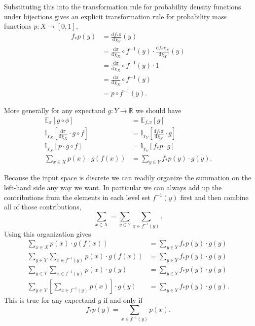 \documentclass[
  letterpaper,
  DIV=11,
  numbers=noendperiod]{scrartcl}
\begin{document}
Substituting this into the transformation rule for probability density
functions under bijections gives an explicit transformation rule for
probability mass functions \(p : X \rightarrow [0, 1]\), \begin{align*}
f_{*} p(y)
&=
\frac{ \mathrm{d} f_{*} \pi }{ \mathrm{d} \chi_{Y} }(y)
\\
&=
\frac{ \mathrm{d} \pi }{ \mathrm{d} \chi_{X} } \circ f^{-1}(y)
\cdot
\frac{ \mathrm{d} f_{*} \chi_{X} }{ \mathrm{d} \chi_{Y} }(y)
\\
&=
\frac{ \mathrm{d} \pi }{ \mathrm{d} \chi_{X} } \circ f^{-1}(y)
\cdot
1
\\
&=
\frac{ \mathrm{d} \pi }{ \mathrm{d} \chi_{X} } \circ f^{-1}(y)
\\
&=
p \circ f^{-1}(y).
\end{align*}

More generally for any expectand \(g : Y \rightarrow \mathbb{R}\) we
should have \begin{align*}
\mathbb{E}_{\pi}[g \circ \phi]
&=
\mathbb{E}_{f_{*} \pi}[g]
\\
\mathbb{I}_{ \chi_{X} }
\left[ \frac{ \mathrm{d} \pi }{ \mathrm{d} \chi_{X} } \cdot g \circ f \right]
&=
\mathbb{I}_{ \chi_{Y} }
\left[ \frac{ \mathrm{d} f_{*} \pi }{ \mathrm{d} \chi_{Y}} \cdot g \right]
\\
\mathbb{I}_{ \chi_{X} }
\left[ p \cdot g \circ f \right]
&=
\mathbb{I}_{ \chi_{Y} }
\left[ f_{*} p \cdot g \right]
\\
\sum_{x \in X} p(x) \cdot g(f(x))
&=
\sum_{y \in Y} f_{*} p(y) \cdot g(y).
\end{align*}

Because the input space is discrete we can readily organize the
summation on the left-hand side any way we want. In particular we can
always add up the contributions from the elements in each level set
\(f^{-1}( y )\) first and then combine all of those contributions, \[
\sum_{x \in X} = \sum_{y \in Y} \sum_{x \in f^{-1}(y)}.
\] Using this organization gives \begin{align*}
\sum_{x \in X} p(x) \cdot g(f(x))
&=
\sum_{y \in Y} f_{*} p(y) \cdot g(y)
\\
\sum_{y \in Y} \sum_{x \in f^{-1}(y)} p(x) \cdot g(f(x))
&=
\sum_{y \in Y} f_{*} p(y) \cdot g(y)
\\
\sum_{y \in Y} \sum_{x \in f^{-1}(y)} p(x) \cdot g(y)
&=
\sum_{y \in Y} f_{*} p(y) \cdot g(y)
\\
\sum_{y \in Y} \left[ \sum_{x \in f^{-1}(y)} p(x) \right] \cdot g(y)
&=
\sum_{y \in Y} f_{*} p(y) \cdot g(y).
\end{align*} This is true for any expectand \(g\) if and only if \[
f_{*} p(y) = \sum_{x \in f^{-1}(y)} p(x).
\]
\end{document}
